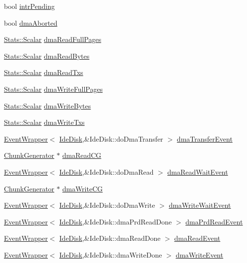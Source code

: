 \begin{DoxyCompactItemize}
\item 
bool \hyperlink{classIdeDisk_aabb849037e6d1c429d270d7fd20e958f}{intrPending}
\item 
bool \hyperlink{classIdeDisk_aedff89f76b12103a29d22ef4de302236}{dmaAborted}
\item 
\hyperlink{classStats_1_1Scalar}{Stats::Scalar} \hyperlink{classIdeDisk_abab6bdef4c30741f3ec4b69e44e9d7c6}{dmaReadFullPages}
\item 
\hyperlink{classStats_1_1Scalar}{Stats::Scalar} \hyperlink{classIdeDisk_a01f4e9b11f3b49ac1cb6cbb6d51674c2}{dmaReadBytes}
\item 
\hyperlink{classStats_1_1Scalar}{Stats::Scalar} \hyperlink{classIdeDisk_a4310d460e8c2b5db635c0b2d1f1887a1}{dmaReadTxs}
\item 
\hyperlink{classStats_1_1Scalar}{Stats::Scalar} \hyperlink{classIdeDisk_adca0399abe696c769a268759b7823090}{dmaWriteFullPages}
\item 
\hyperlink{classStats_1_1Scalar}{Stats::Scalar} \hyperlink{classIdeDisk_a59676f0552c89ab5f75ed2e6d8fca378}{dmaWriteBytes}
\item 
\hyperlink{classStats_1_1Scalar}{Stats::Scalar} \hyperlink{classIdeDisk_a2bb232dff5f135210d3350a21d1c9ccf}{dmaWriteTxs}
\item 
\hyperlink{classEventWrapper}{EventWrapper}$<$ \hyperlink{classIdeDisk}{IdeDisk},\&IdeDisk::doDmaTransfer $>$ \hyperlink{classIdeDisk_aa90327d610dcc75173d1cd63671c6d31}{dmaTransferEvent}
\item 
\hyperlink{classChunkGenerator}{ChunkGenerator} $\ast$ \hyperlink{classIdeDisk_aafb836a34095616e67256a58e31ca604}{dmaReadCG}
\item 
\hyperlink{classEventWrapper}{EventWrapper}$<$ \hyperlink{classIdeDisk}{IdeDisk},\&IdeDisk::doDmaRead $>$ \hyperlink{classIdeDisk_a163b3ebdf005a99628b313b535697fb4}{dmaReadWaitEvent}
\item 
\hyperlink{classChunkGenerator}{ChunkGenerator} $\ast$ \hyperlink{classIdeDisk_a9efaedbad52401a1b8ac2b8f1dffd28e}{dmaWriteCG}
\item 
\hyperlink{classEventWrapper}{EventWrapper}$<$ \hyperlink{classIdeDisk}{IdeDisk},\&IdeDisk::doDmaWrite $>$ \hyperlink{classIdeDisk_ad35ded50a6e608571cb80f1ad9741514}{dmaWriteWaitEvent}
\item 
\hyperlink{classEventWrapper}{EventWrapper}$<$ \hyperlink{classIdeDisk}{IdeDisk},\&IdeDisk::dmaPrdReadDone $>$ \hyperlink{classIdeDisk_aee6a35e547d828db5c3f993da6179be0}{dmaPrdReadEvent}
\item 
\hyperlink{classEventWrapper}{EventWrapper}$<$ \hyperlink{classIdeDisk}{IdeDisk},\&IdeDisk::dmaReadDone $>$ \hyperlink{classIdeDisk_a7c5e1828543bec774a42b971376bb618}{dmaReadEvent}
\item 
\hyperlink{classEventWrapper}{EventWrapper}$<$ \hyperlink{classIdeDisk}{IdeDisk},\&IdeDisk::dmaWriteDone $>$ \hyperlink{classIdeDisk_a6c721e441022d80574b109229351326a}{dmaWriteEvent}
\end{DoxyCompactItemize}
